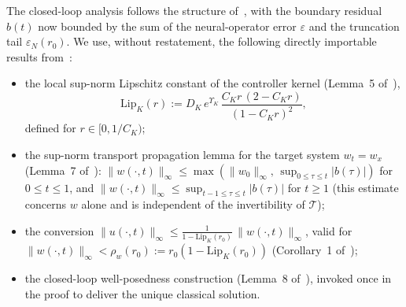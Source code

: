 \documentclass[twocolumn,amsthm]{autart}
\newcommand{\Lipk}{\mathrm{Lip}_K}
\newcommand{\eps}{\varepsilon}
\theoremstyle{plain}
\theoremstyle{definition}
\begin{document}
The closed-loop analysis follows the structure of~\cite{krstic2026feedbacklinearizationhyperbolicpdes-trunc}, with the boundary residual $b(t)$ now bounded by the sum of the neural-operator error $\eps$ and the truncation tail $\eps_N(r_0)$. We use, without restatement, the following directly importable results from~\cite{krstic2026feedbacklinearizationhyperbolicpdes-trunc}:
\begin{itemize}[leftmargin=1.2em]
\item the local sup-norm Lipschitz constant of the controller kernel (Lemma~5 of~\cite{krstic2026feedbacklinearizationhyperbolicpdes-trunc}),
\begin{equation}
\Lipk(r) := D_K\,e^{\Upsilon_K}\,\frac{C_K r\,(2 - C_K r)}{(1 - C_K r)^2},
\label{eq:LipK-imp}
\end{equation}
defined for $r \in [0, 1/C_K)$;
\item the sup-norm transport propagation lemma for the target system $w_t = w_x$ (Lemma~7 of~\cite{krstic2026feedbacklinearizationhyperbolicpdes-trunc}): $\|w(\cdot,t)\|_\infty \le \max(\|w_0\|_\infty,\, \sup_{0\le\tau\le t}|b(\tau)|)$ for $0 \le t \le 1$, and $\|w(\cdot,t)\|_\infty \le \sup_{t-1 \le \tau \le t}|b(\tau)|$ for $t \ge 1$ (this estimate concerns $w$ alone and is independent of the invertibility of $\mathcal{T}$);
\item the conversion $\|u(\cdot,t)\|_\infty \le \frac{1}{1-\Lipk(r_0)}\,\|w(\cdot,t)\|_\infty$, valid for $\|w(\cdot,t)\|_\infty < \rho_w(r_0) := r_0(1 - \Lipk(r_0))$ (Corollary~1 of~\cite{krstic2026feedbacklinearizationhyperbolicpdes-trunc});
\item the closed-loop well-posedness construction (Lemma~8 of~\cite{krstic2026feedbacklinearizationhyperbolicpdes-trunc}), invoked once in the proof to deliver the unique classical solution.
\end{itemize}
\end{document}
